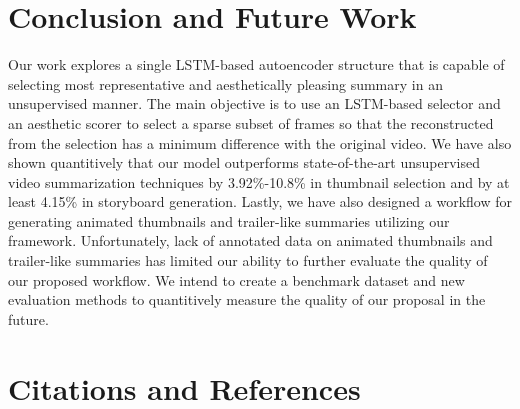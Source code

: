 \documentclass[5pt]{article}
\begin{document}

\section{Conclusion and Future Work}
Our work explores a single LSTM-based autoencoder structure that is capable of selecting most representative and aesthetically pleasing summary in an unsupervised manner. The main objective is to use an LSTM-based selector and an aesthetic scorer to select a sparse subset of frames so that the reconstructed from the selection has a minimum difference with the original video. We have also shown quantitively that our model outperforms state-of-the-art unsupervised video summarization techniques by 3.92\%-10.8\% in thumbnail selection and by at least 4.15\% in storyboard generation. Lastly, we have also designed a workflow for generating animated thumbnails and trailer-like summaries utilizing our framework. Unfortunately, lack of annotated data on animated thumbnails and trailer-like summaries has limited our ability to further evaluate the quality of our proposed workflow. We intend to create a benchmark dataset and new evaluation methods to quantitively measure the quality of our proposal in the future.

\section{Citations and References}




\end{document}
